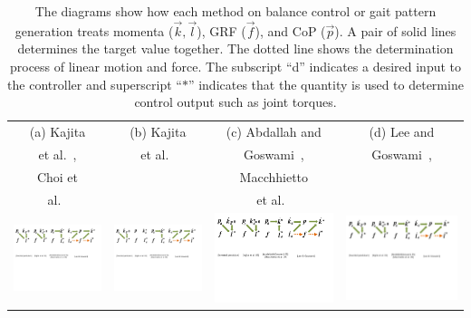 \documentclass{llncs}
\newcommand{\vp}{\vec{p}}
\newcommand{\vk}{\vec{k}}
\newcommand{\vf}{\vec{f}}
\newcommand{\vl}{\vec{l}}
\begin{document}
\begin{table}[h]
\begin{center}
\caption{The diagrams show how each method
on balance control or gait pattern generation
treats momenta ($\vk,\vl$), GRF ($\vf$),
and CoP ($\vp$). A pair of solid lines determines the target value together.
The dotted line shows the determination process of linear motion and force.
The subscript ``d'' indicates a desired input to the controller
and superscript ``$\ast$'' indicates that the quantity is used to determine control
output such as joint torques.}
\begin{tabular}{c|c|c|c}
\hline
{\scriptsize (a) Kajita } & {\scriptsize (b) Kajita } & {\scriptsize (c) Abdallah and }  & {\scriptsize (d) Lee and }  \\

{\scriptsize et al.~\cite{KKKYH01}, } & {\scriptsize et al.~\cite{KKKFHYH03}} & {\scriptsize Goswami~\cite{AG05},} & {\scriptsize Goswami~\cite{LeeGoswami10},}\\

{\scriptsize Choi et }& &{\scriptsize Macchhietto} & {\scriptsize~\cite{LG12}}\\
{\scriptsize al.~\cite{Choi07}}& &{\scriptsize et al.~\cite{Macchietto09}} & \\
\hline
\hline
\includegraphics[width=0.13\columnwidth]{Figures/lkpf-diagram-LIPM.pdf}
&
\includegraphics[width=0.13\columnwidth]{Figures/lkpf-diagram-resolvedMomentum.pdf}
&
\includegraphics[width=0.13\columnwidth]{Figures/lkpf-diagram-maccietto.pdf}
&
\includegraphics[width=0.23\columnwidth]{Figures/lkpf-diagram-LeeGoswami.pdf} \\
\hline
\end{tabular}
\label{tab:comparison}
\end{center}
\end{table}
\end{document}

